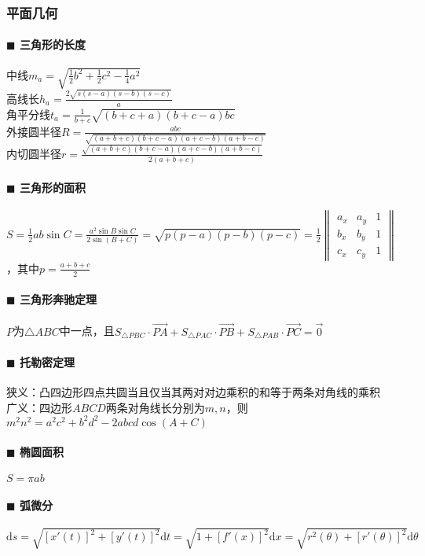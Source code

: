 \subsubsection{平面几何}
\paragraph{$\blacksquare$ 三角形的长度\\}
中线$m_a=\sqrt{\frac{1}{2} b^2+\frac{1}{2} c^2-\frac{1}{4} a^2}$\\
高线长$h_a=\frac{2\sqrt{s(s-a)(s-b)(s-c)}}{a}$\\
角平分线$t_a=\frac{1}{b+c} \sqrt{(b+c+a)(b+c-a)bc}$\\
外接圆半径$R=\frac{abc}{\sqrt{(a+b+c)(b+c-a)(a+c-b)(a+b-c)}}$\\
内切圆半径$r=\frac{\sqrt{(a+b+c)(b+c-a)(a+c-b)(a+b-c)}}{2(a+b+c)}$
\paragraph{$\blacksquare$ 三角形的面积}
$S=\frac{1}{2} ab\sin C=\frac{a^2\sin B\sin C}{2\sin (B+C)}=\sqrt{p(p-a)(p-b)(p-c)}=\frac{1}{2}\begin{Vmatrix} a_x & a_y & 1\\ b_x & b_y & 1\\ c_x & c_y & 1 \end{Vmatrix}$，其中$p=\frac{a+b+c}{2}$
\paragraph{$\blacksquare$ 三角形奔驰定理}
$P$为$\triangle ABC$中一点，且$S_{\triangle PBC} \cdot \overrightarrow{PA}+S_{\triangle PAC} \cdot \overrightarrow{PB}+S_{\triangle PAB} \cdot \overrightarrow{PC}=\vec 0$
\paragraph{$\blacksquare$ 托勒密定理}
狭义：凸四边形四点共圆当且仅当其两对对边乘积的和等于两条对角线的乘积\\
广义：四边形$ABCD$两条对角线长分别为$m, n$，则$m^2 n^2=a^2 c^2+b^2 d^2-2abcd \cos(A+C)$
\paragraph{$\blacksquare$ 椭圆面积}
$S=\pi ab$
\paragraph{$\blacksquare$ 弧微分}
$\mathrm{d}s=\sqrt{[x'(t)]^2+[y'(t)]^2} \mathrm{d} t=\sqrt{1+[f'(x)]^2} \mathrm{d} x=\sqrt{r^2(\theta)+[r'(\theta)]^2} \mathrm{d} \theta$

